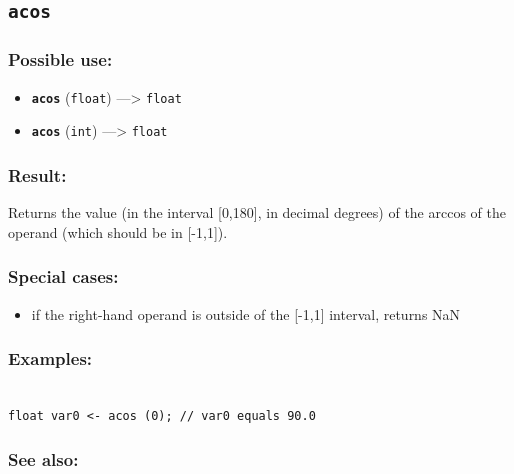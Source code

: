 \documentclass[]{book}
\providecommand{\tightlist}{%
  \setlength{\itemsep}{0pt}\setlength{\parskip}{0pt}}
\theoremstyle{definition}
\theoremstyle{definition}
\theoremstyle{definition}
\theoremstyle{remark}
\begin{document}
\subsection{\texorpdfstring{\texttt{acos}}{acos}}\label{acos}

\subsubsection{Possible use:}\label{possible-use-18}

\begin{itemize}
\tightlist
\item
  \textbf{\texttt{acos}} (\texttt{float}) ---\textgreater{}
  \texttt{float}
\item
  \textbf{\texttt{acos}} (\texttt{int}) ---\textgreater{} \texttt{float}
\end{itemize}

\subsubsection{Result:}\label{result-17}

Returns the value (in the interval {[}0,180{]}, in decimal degrees) of
the arccos of the operand (which should be in {[}-1,1{]}).

\subsubsection{Special cases:}\label{special-cases-13}

\begin{itemize}
\tightlist
\item
  if the right-hand operand is outside of the {[}-1,1{]} interval,
  returns NaN
\end{itemize}

\subsubsection{Examples:}\label{examples-14}

\begin{verbatim}
 
float var0 <- acos (0); // var0 equals 90.0
\end{verbatim}

\subsubsection{See also:}\label{see-also-15}
\end{document}
